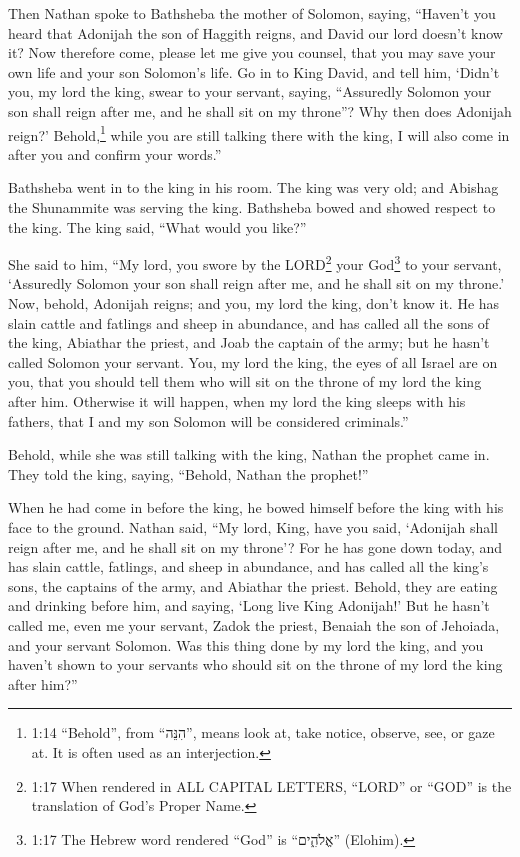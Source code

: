 \myverse{}Then Nathan spoke to Bathsheba the mother of Solomon, saying,
“Haven’t you heard that Adonijah the son of Haggith reigns, and David our lord doesn’t know it?
\myverse{}Now therefore come, please let me give you counsel, that you may save your
own life and your son Solomon’s life.
\myverse{}Go in to King David, and tell him, ‘Didn’t you, my lord the king, swear to
your servant, saying, “Assuredly Solomon your son shall reign after me, and he shall sit on my throne”?
Why then does Adonijah reign?’
\myverse{}Behold,\footnote{1:14 “Behold”, from “הִנֵּה”, means look at, take notice, observe, see, or gaze at. It is
	often used as an interjection.} while you are still talking there with the king, I will also come
in after you and confirm your words.”

\myverse{}Bathsheba went in to the king in his room. The king was very
old; and Abishag the Shunammite was serving the king.
\myverse{}Bathsheba bowed and showed respect to the king. The king said, “What would
you like?”

\myverse{}She said to him, “My lord, you swore by the LORD\footnote{1:17 When rendered in ALL CAPITAL LETTERS, “LORD” or “GOD” is the translation of God’s Proper Name.
} your God\footnote{1:17 The Hebrew word rendered “God” is “אֱלֹהִ֑ים” (Elohim).} to your servant, ‘Assuredly
Solomon your son shall reign after me, and he shall sit on my throne.’
\myverse{}Now, behold, Adonijah reigns; and you, my lord the king, don’t know it.
\myverse{}He has slain cattle and fatlings and sheep in abundance, and has called all
the sons of the king, Abiathar the priest, and Joab the captain of the army; but he hasn’t called Solomon
your servant.
\myverse{}You, my lord the king, the eyes of all Israel are on you, that you should
tell them who will sit on the throne of my lord the king after him.
\myverse{}Otherwise it will happen, when my lord the king sleeps with his fathers, that
I and my son Solomon will be considered criminals.”

\myverse{}Behold, while she was still talking with the king, Nathan the
prophet came in.
\myverse{}They told the king, saying, “Behold, Nathan the prophet!”

When he had come in before the king, he bowed himself before the king with his face to the
ground.
\myverse{}Nathan said, “My lord, King, have you said, ‘Adonijah shall reign after me,
and he shall sit on my throne’?
\myverse{}For he has gone down today, and has slain cattle, fatlings, and sheep in abundance,
and has called all the king’s sons, the captains of the army, and Abiathar the priest. Behold, they are
eating and drinking before him, and saying, ‘Long live King Adonijah!’
\myverse{}But he hasn’t called me, even me your servant, Zadok the priest, Benaiah the
son of Jehoiada, and your servant Solomon.
\myverse{}Was this thing done by my lord the king, and you haven’t shown to your servants
who should sit on the throne of my lord the king after him?”

